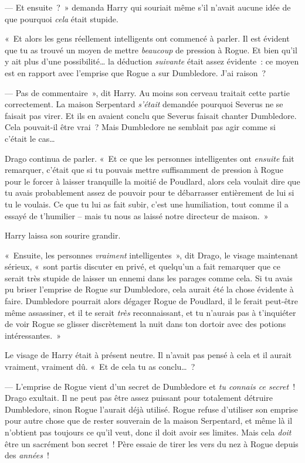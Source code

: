 --- Et ensuite~?~»
demanda Harry qui souriait même s'il n'avait aucune idée de que pourquoi \emph{cela} était stupide.

«~Et alors les gens réellement intelligents ont commencé à parler.
Il est évident que tu as trouvé un moyen de mettre \emph{beaucoup} de pression à Rogue.
Et bien qu'il y ait plus d'une possibilité… la déduction \emph{suivante} était assez évidente~: ce moyen est en rapport avec l'emprise que Rogue a sur Dumbledore.
J'ai raison~?

--- Pas de commentaire~», dit Harry.
Au moins son cerveau traitait cette partie correctement.
La maison Serpentard \emph{s'était} demandée pourquoi Severus ne se faisait pas virer.
Et ils en avaient conclu que Severus faisait chanter Dumbledore.
Cela pouvait-il être vrai~?
Mais Dumbledore ne semblait pas agir comme si c'était le cas…

Drago continua de parler.
«~Et ce que les personnes intelligentes ont \emph{ensuite} fait remarquer, c'était que si tu pouvais mettre suffisamment de pression à Rogue pour le forcer à laisser tranquille la moitié de Poudlard, alors cela voulait dire que tu avais probablement assez de pouvoir pour te débarrasser entièrement de lui si tu le voulais.
Ce que tu lui as fait subir, c'est une humiliation, tout comme il a essayé de t'humilier -- mais tu nous as laissé notre directeur de maison.~»

Harry laissa son sourire grandir.

«~Ensuite, les personnes \emph{vraiment} intelligentes~», dit Drago, le visage maintenant sérieux, «~sont partis discuter en privé, et quelqu'un a fait remarquer que ce serait très stupide de laisser un ennemi dans les parages comme cela.
Si tu avais pu briser l'emprise de Rogue sur Dumbledore, cela aurait été la chose évidente à faire.
Dumbledore pourrait alors dégager Rogue de Poudlard, il le ferait peut-être même assassiner, et il te serait \emph{très} reconnaissant, et tu n'aurais pas à t'inquiéter de voir Rogue se glisser discrètement la nuit dans ton dortoir avec des potions intéressantes.~»

Le visage de Harry était à présent neutre.
Il n'avait pas pensé à cela et il aurait vraiment, vraiment dû.
«~Et de cela tu as conclu…~?

--- L'emprise de Rogue vient d'un secret de Dumbledore et \emph{tu connais ce secret}~!
Drago exultait.
Il ne peut pas être assez puissant pour totalement détruire Dumbledore, sinon Rogue l'aurait déjà utilisé.
Rogue refuse d'utiliser son emprise pour autre chose que de rester souverain de la maison Serpentard, et même là il n'obtient pas toujours ce qu'il veut, donc il doit avoir ses limites.
Mais cela \emph{doit} être un sacrément bon secret~!
Père essaie de tirer les vers du nez à Rogue depuis des \emph{années}~!

